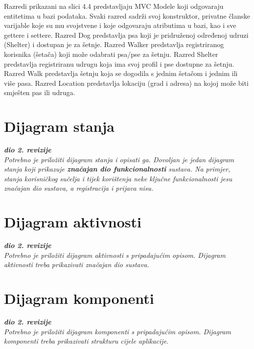 			
			Razredi prikazani na slici 4.4 predstavljaju MVC Modele koji odgovaraju entitetima u bazi podataka. Svaki razred sadrži svoj konstruktor, privatne članske varijable koje su mu svojstvene i koje odgovaraju atributima u bazi, kao i sve gettere i settere.
			Razred Dog predstavlja psa koji je pridruženoj određenoj udruzi (Shelter) i dostupan je za šetnje. Razred Walker predstavlja registriranog korisnika (šetača) koji može odabrati psa/pse za šetnju. Razred Shelter predstavlja registriranu udrugu koja ima svoj profil i pse dostupne za šetnju. Razred Walk predstavlja šetnju koja se dogodila s jednim šetačom i jednim ili više pasa. Razred Location predstavlja lokaciju (grad i adresa) na kojoj može biti smješten pas ili udruga.
			
			

			
			\eject
		
		\section{Dijagram stanja}
			
			
			\textbf{\textit{dio 2. revizije}}\\
			
			\textit{Potrebno je priložiti dijagram stanja i opisati ga. Dovoljan je jedan dijagram stanja koji prikazuje \textbf{značajan dio funkcionalnosti} sustava. Na primjer, stanja korisničkog sučelja i tijek korištenja neke ključne funkcionalnosti jesu značajan dio sustava, a registracija i prijava nisu. }
			
			
			\eject 
		
		\section{Dijagram aktivnosti}
			
			\textbf{\textit{dio 2. revizije}}\\
			
			 \textit{Potrebno je priložiti dijagram aktivnosti s pripadajućim opisom. Dijagram aktivnosti treba prikazivati značajan dio sustava.}
			
			\eject
		\section{Dijagram komponenti}
		
			\textbf{\textit{dio 2. revizije}}\\
		
			 \textit{Potrebno je priložiti dijagram komponenti s pripadajućim opisom. Dijagram komponenti treba prikazivati strukturu cijele aplikacije.}